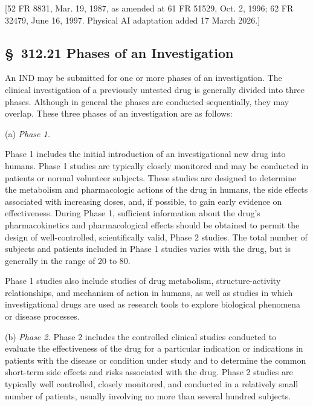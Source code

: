 [52 FR 8831, Mar. 19, 1987, as amended at 61 FR 51529, Oct. 2, 1996; 62 FR 32479, June 16, 1997. Physical AI adaptation added 17 March 2026.]

\subsection{\S~312.21 Phases of an Investigation}

An IND may be submitted for one or more phases of an investigation. The clinical investigation of a previously untested drug is generally divided into three phases. Although in general the phases are conducted sequentially, they may overlap. These three phases of an investigation are as follows:

(a) \textit{Phase 1.}

\begin{description}[leftmargin=0.5cm,style=sameline]
\item[(1)] Phase 1 includes the initial introduction of an investigational new drug into humans. Phase 1 studies are typically closely monitored and may be conducted in patients or normal volunteer subjects. These studies are designed to determine the metabolism and pharmacologic actions of the drug in humans, the side effects associated with increasing doses, and, if possible, to gain early evidence on effectiveness. During Phase 1, sufficient information about the drug's pharmacokinetics and pharmacological effects should be obtained to permit the design of well-controlled, scientifically valid, Phase 2 studies. The total number of subjects and patients included in Phase 1 studies varies with the drug, but is generally in the range of 20 to 80.
\item[(2)] Phase 1 studies also include studies of drug metabolism, structure-activity relationships, and mechanism of action in humans, as well as studies in which investigational drugs are used as research tools to explore biological phenomena or disease processes.
\end{description}

(b) \textit{Phase 2.} Phase 2 includes the controlled clinical studies conducted to evaluate the effectiveness of the drug for a particular indication or indications in patients with the disease or condition under study and to determine the common short-term side effects and risks associated with the drug. Phase 2 studies are typically well controlled, closely monitored, and conducted in a relatively small number of patients, usually involving no more than several hundred subjects.

